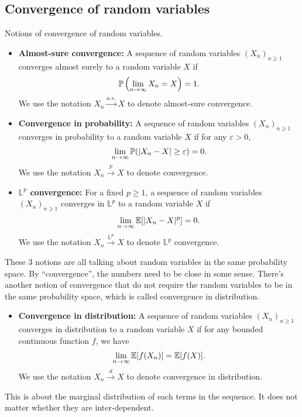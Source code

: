 \documentclass[11pt,letterpaper]{article}
\begin{document}
\subsection{Convergence of random variables}
Notions of convergence of random variables.
\begin{itemize}
  \item \textbf{Almost-sure convergence:} A sequence of random variables $(X_n)_{n \geq 1}$ converges almost surely to a random variable $X$ if
  \begin{align*}
    {\mathbb{P}}\left(\lim_{n \to \infty} X_n = X\right) = 1.
  \end{align*}
  We use the notation $X_n \xrightarrow{a.s.} X$ to denote almost-sure convergence.
  \item \textbf{Convergence in probability:} A sequence of random variables $(X_n)_{n \geq 1}$ converges in probability to a random variable $X$ if for any $\varepsilon > 0$,
  \begin{align*}
    \lim_{n \to \infty} {\mathbb{P}}(|X_n - X| \geq \varepsilon) = 0.
  \end{align*}
  We use the notation $X_n \xrightarrow{p} X$ to denote convergence.
  \item \textbf{$\mathbb{L}^p$ convergence:} For a fixed $p \geq 1$, a sequence of random variables $(X_n)_{n \geq 1}$ converges in $\mathbb{L}^p$ to a random variable $X$ if
  \begin{align*}
    \lim_{n \to \infty} {\mathbb{E}}[|X_n - X|^p] = 0.
  \end{align*}
  We use the notation $X_n \xrightarrow{\mathbb{L}^p} X$ to denote $\mathbb{L}^p$ convergence.
\end{itemize}
These 3 notions are all talking about random variables in the same probability space. By ``convergence'', the numbers need to be close in some sense. There's another notion of convergence that do not require the random variables to be in the same probability space, which is called convergence in distribution.
\begin{itemize}
  \item \textbf{Convergence in distribution:} A sequence of random variables $(X_n)_{n \geq 1}$ converges in distribution to a random variable $X$ if for any bounded continuous function $f$, we have
  \begin{align*}
    \lim_{n \to \infty} {\mathbb{E}}[f(X_n)] = {\mathbb{E}}[f(X)].
  \end{align*}
  We use the notation $X_n \xrightarrow{d} X$ to denote convergence in distribution.
\end{itemize}
This is about the marginal distribution of each terms in the sequence. It does not matter whether they are inter-dependent.
\end{document}
